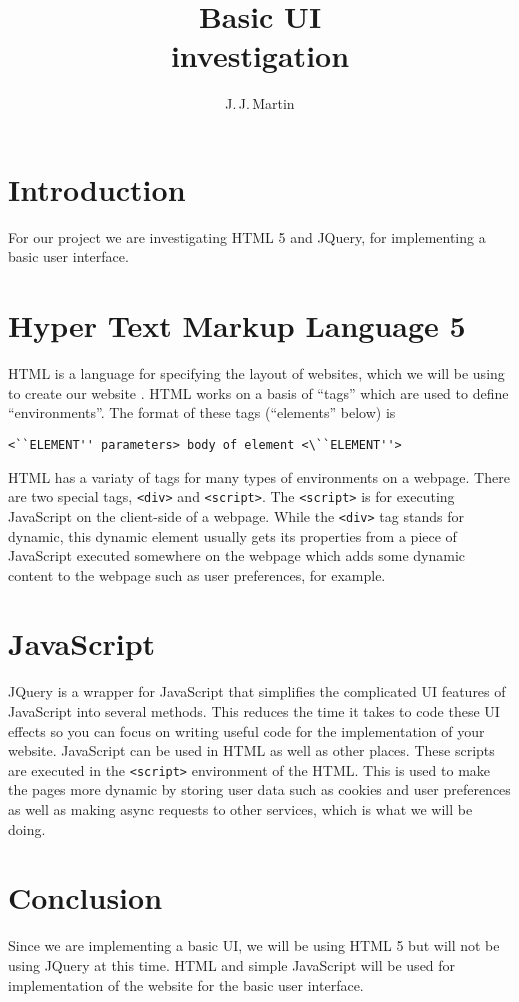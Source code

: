 \documentclass{article}
\author{J.\,J.\,Martin}
\title{Basic UI \\investigation}
\begin{document}
\maketitle

\section{Introduction}
For our project we are investigating HTML 5 and JQuery, for implementing a basic user interface.
\section{Hyper Text Markup Language 5}
HTML is a language for specifying the layout of websites, which we will be using to create our website . HTML works on a basis of ``tags'' which are used to define ``environments''. The format of these tags (``elements'' below) is \begin{verbatim}<``ELEMENT'' parameters> body of element <\``ELEMENT''>\end{verbatim} HTML has a variaty of tags for many types of environments on a webpage. There are two special tags, \verb+<div>+ and \verb+<script>+. The \verb+<script>+ is for executing JavaScript on the client-side of  a webpage. While the \verb+<div>+ tag stands for dynamic, this dynamic element usually gets its properties from a piece of JavaScript executed somewhere on the webpage which adds some dynamic content to the webpage such as user preferences, for example.
\section{JavaScript}
JQuery is a wrapper for JavaScript that simplifies the complicated UI features of JavaScript into several methods. This reduces the time it takes to code these UI effects so you can focus on writing useful code for the implementation of your website. JavaScript can be used in HTML as well as other places. These scripts are executed in the \verb+<script>+ environment of the HTML. This is used to make the pages more dynamic by storing user data such as cookies and user preferences as well as making async requests to other services, which is what we will be doing.  

\section{Conclusion}
Since we are implementing a basic UI, we will be using HTML 5 but will not be using JQuery at this time. HTML and simple JavaScript will be used for implementation of the website for the basic user interface.
\end{document}
